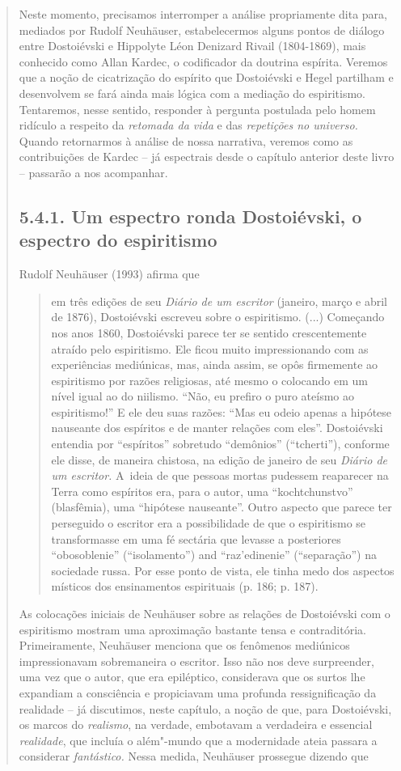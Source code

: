 {\begin{quote}
Neste momento, precisamos interromper a análise propriamente dita para,
mediados por Rudolf Neuhäuser, estabelecermos alguns pontos de diálogo
entre Dostoiévski e Hippolyte Léon Denizard Rivail (1804-1869), mais
conhecido como Allan Kardec, o codificador da doutrina espírita. Veremos
que a noção de cicatrização do espírito que Dostoiévski e Hegel
partilham e desenvolvem se fará ainda mais lógica com a mediação do
espiritismo. Tentaremos, nesse sentido, responder à pergunta postulada
pelo homem ridículo a respeito da \emph{retomada da vida} e das
\emph{repetições no universo.} Quando retornarmos à análise de nossa
narrativa, veremos como as contribuições de Kardec -- já espectrais
desde o capítulo anterior deste livro -- passarão a nos acompanhar.

\subsection{5.4.1. Um espectro ronda Dostoiévski, o espectro do espiritismo}

Rudolf Neuhäuser (1993) afirma que

\begin{quote}
em três edições de seu \emph{Diário de um escritor} (janeiro, março e
abril de 1876), Dostoiévski escreveu sobre o espiritismo. (...)
Começando nos anos 1860, Dostoiévski parece ter se sentido
crescentemente atraído pelo espiritismo. Ele ficou muito impressionando
com as experiências mediúnicas, mas, ainda assim, se opôs firmemente ao
espiritismo por razões religiosas, até mesmo o colocando em um nível
igual ao do niilismo. ``Não, eu prefiro o puro ateísmo ao espiritismo!''
E ele deu suas razões: ``Mas eu odeio apenas a hipótese nauseante dos
espíritos e de manter relações com eles''. Dostoiévski entendia por
``espíritos'' sobretudo ``demônios'' (``tcherti''), conforme ele disse,
de maneira chistosa, na edição de janeiro de seu \emph{Diário de um
escritor.} A~ideia de que pessoas mortas pudessem reaparecer na Terra
como espíritos era, para o autor, uma ``kochtchunstvo'' (blasfêmia), uma
``hipótese nauseante''. Outro aspecto que parece ter perseguido o
escritor era a possibilidade de que o espiritismo se transformasse em
uma fé sectária que levasse a posteriores ``obosoblenie''
(``isolamento'') and ``raz'edinenie'' (``separação'') na sociedade
russa. Por esse ponto de vista, ele tinha medo dos aspectos místicos dos
ensinamentos espirituais (p. 186; p. 187).
\end{quote}

As colocações iniciais de Neuhäuser sobre as relações de Dostoiévski com
o espiritismo mostram uma aproximação bastante tensa e contraditória.
Primeiramente, Neuhäuser menciona que os fenômenos mediúnicos
impressionavam sobremaneira o escritor. Isso não nos deve surpreender,
uma vez que o autor, que era epiléptico, considerava que os surtos lhe
expandiam a consciência e propiciavam uma profunda ressignificação da
realidade -- já discutimos, neste capítulo, a noção de que, para
Dostoiévski, os marcos do \emph{realismo}, na verdade, embotavam a
verdadeira e essencial \emph{realidade}, que incluía o além"-mundo que a
modernidade ateia passara a considerar \emph{fantástico.} Nessa medida,
Neuhäuser prossegue dizendo que


\end{quote}}
